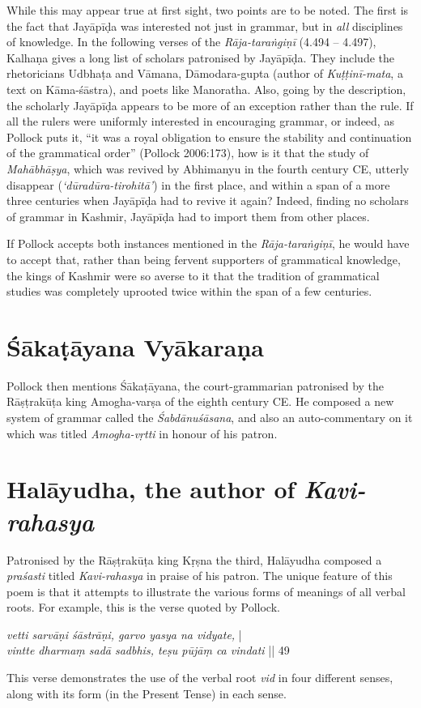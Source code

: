 While this may appear true at first sight, two points are to be noted. The first is the fact that Jayāpīḍa was interested not just in grammar, but in {\sl all} disciplines of knowledge. In the following verses of the {\sl Rāja-taraṅgiṇī} (4.494 -- 4.497), Kalhaṇa gives a long list of scholars patronised by Jayāpīḍa. They include the rhetoricians Udbhaṭa and Vāmana, Dāmodara-gupta (author of {\sl Kuṭṭinī-mata}, a text on Kāma-śāstra), and poets like Manoratha. Also, going by the description, the scholarly Jayāpīḍa appears to be more of an exception rather than the rule. If all the rulers were uniformly interested in encouraging grammar, or indeed, as Pollock puts it, ``it was a royal obligation to ensure the stability and continuation of the grammatical order'' (Pollock 2006:173), how is it that the study of {\sl Mahābhāṣya}, which was revived by Abhimanyu in the fourth century CE, utterly disappear ({\sl `dūradūra-tirohitā'}) in the first place, and within a span of a more three centuries when Jayāpīḍa had to revive it again? Indeed, finding no scholars of grammar in Kashmir, Jayāpīḍa had to import them from other places. 

If Pollock accepts both instances mentioned in the {\sl Rāja-taraṅgiṇī}, he would have to accept that, rather than being fervent supporters of grammatical knowledge, the kings of Kashmir were so averse to it that the tradition of grammatical studies was completely uprooted twice within the span of a few centuries.

\section{Śākaṭāyana Vyākaraṇa}\label{chap3-sec13}

Pollock then mentions Śākaṭāyana,  the court-grammarian patronised by the Rāṣṭrakūṭa king Amogha-varṣa of the eighth century CE. He composed a new system of grammar called the {\sl Śabdānuśāsana}, and also an auto-commentary on it which was titled {\sl Amogha-vṛtti} in honour of his patron. 

\section{Halāyudha, the author of {\sl\bfseries Kavi-rahasya}}\label{chap3-sec14}

Patronised by the Rāṣṭrakūṭa king Kṛṣna the third, Halāyudha composed a {\sl praśasti} titled {\sl Kavi-rahasya} in praise of his patron. The unique feature of this poem is that it attempts to illustrate the various forms of meanings of all verbal roots. For example, this is the verse quoted by Pollock. 
\begin{myquote}
{{\sl vetti sarvāṇi śāstrāṇi, garvo yasya na vidyate,}} |\\[2pt]
{{\sl vintte dharmaṃ sadā sadbhis, teṣu pūjāṃ ca vindati}} || 49 
\end{myquote}
This verse demonstrates the use of the verbal root {\sl vid} in four different senses, along with its form (in the Present Tense) in each sense.

